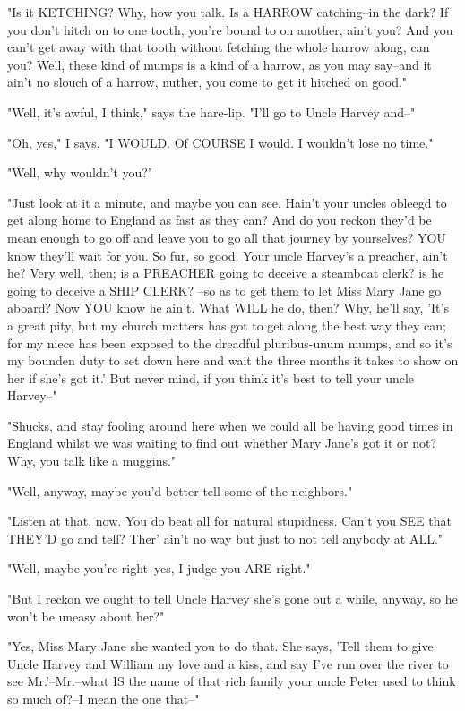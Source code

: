 "Is it KETCHING?  Why, how you talk.  Is a HARROW catching--in the dark?
If you don't hitch on to one tooth, you're bound to on another, ain't
you? And you can't get away with that tooth without fetching the whole
harrow along, can you?  Well, these kind of mumps is a kind of a harrow,
as you may say--and it ain't no slouch of a harrow, nuther, you come to
get it hitched on good."

"Well, it's awful, I think," says the hare-lip.  "I'll go to Uncle Harvey
and--"

"Oh, yes," I says, "I WOULD.  Of COURSE I would.  I wouldn't lose no
time."

"Well, why wouldn't you?"

"Just look at it a minute, and maybe you can see.  Hain't your uncles
obleegd to get along home to England as fast as they can?  And do you
reckon they'd be mean enough to go off and leave you to go all that
journey by yourselves?  YOU know they'll wait for you.  So fur, so good.
Your uncle Harvey's a preacher, ain't he?  Very well, then; is a PREACHER
going to deceive a steamboat clerk? is he going to deceive a SHIP CLERK?
--so as to get them to let Miss Mary Jane go aboard?  Now YOU know he
ain't.  What WILL he do, then?  Why, he'll say, 'It's a great pity, but
my church matters has got to get along the best way they can; for my
niece has been exposed to the dreadful pluribus-unum mumps, and so it's
my bounden duty to set down here and wait the three months it takes to
show on her if she's got it.'  But never mind, if you think it's best to
tell your uncle Harvey--"

"Shucks, and stay fooling around here when we could all be having good
times in England whilst we was waiting to find out whether Mary Jane's
got it or not?  Why, you talk like a muggins."

"Well, anyway, maybe you'd better tell some of the neighbors."

"Listen at that, now.  You do beat all for natural stupidness.  Can't you
SEE that THEY'D go and tell?  Ther' ain't no way but just to not tell
anybody at ALL."

"Well, maybe you're right--yes, I judge you ARE right."

"But I reckon we ought to tell Uncle Harvey she's gone out a while,
anyway, so he won't be uneasy about her?"

"Yes, Miss Mary Jane she wanted you to do that.  She says, 'Tell them to
give Uncle Harvey and William my love and a kiss, and say I've run over
the river to see Mr.'--Mr.--what IS the name of that rich family your
uncle Peter used to think so much of?--I mean the one that--"

